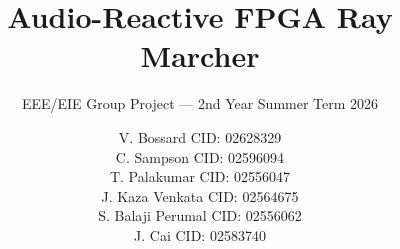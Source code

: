 \documentclass[oneside]{ic_eee_thesis}
\title{Audio-Reactive FPGA Ray Marcher}
\subtitle{EEE/EIE Group Project — 2nd Year Summer Term 2026}
\author{
  V. Bossard CID: 02628329 \\[1mm]
  C. Sampson  CID: 02596094 \\[1mm]
  T. Palakumar CID: 02556047 \\[1mm]
  J. Kaza Venkata CID: 02564675 \\[1mm]
  S. Balaji Perumal CID: 02556062 \\[1mm]
  J. Cai CID: 02583740 \\[1mm]
}
\begin{document}
\preamble













\appendix


\cleardoublepage
\nocite{*}
\printbibliography
\end{document}
